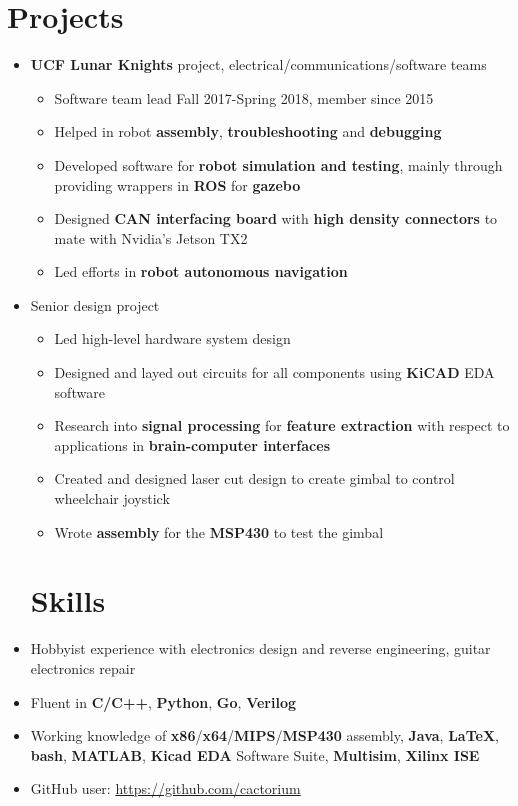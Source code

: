 \documentclass{my_resume}
\begin{document}
\section{Projects}
\begin{itemize}
    \item \textbf{UCF Lunar Knights} project, electrical/communications/software teams
        \begin{itemize}
          \item Software team lead Fall 2017-Spring 2018, member since 2015
          \item Helped in robot \textbf{assembly}, \textbf{troubleshooting} and \textbf{debugging}
          \item Developed software for \textbf{robot simulation and testing}, mainly through providing wrappers
            in \textbf{ROS} for \textbf{gazebo}
          \item Designed \textbf{CAN interfacing board} with \textbf{high density connectors} to mate with Nvidia's Jetson TX2
          \item Led efforts in \textbf{robot autonomous navigation}
        \end{itemize}
    \item Senior design project
        \begin{itemize}
            \item Led high-level hardware system design
            \item Designed and layed out circuits for all components using \textbf{KiCAD} EDA software
            \item Research into \textbf{signal processing} for \textbf{feature extraction} with respect to applications in \textbf{brain-computer interfaces}
            \item Created and designed laser cut design to create gimbal to control wheelchair joystick
            \item Wrote \textbf{assembly} for the \textbf{MSP430} to test the gimbal
        \end{itemize}
\section{Skills}
    \item Hobbyist experience with electronics design and reverse engineering, guitar electronics
        repair
    \item Fluent in \textbf{C/C++}, \textbf{Python}, \textbf{Go}, \textbf{Verilog}
    \item Working knowledge of \textbf{x86}/\textbf{x64}/\textbf{MIPS}/\textbf{MSP430} assembly, \textbf{Java}, \textbf{LaTeX}, \textbf{bash}, \textbf{MATLAB}, \textbf{Kicad EDA} Software Suite, \textbf{Multisim}, \textbf{Xilinx ISE}
    \item GitHub user: \url{https://github.com/cactorium}
\end{itemize}
\end{document}

